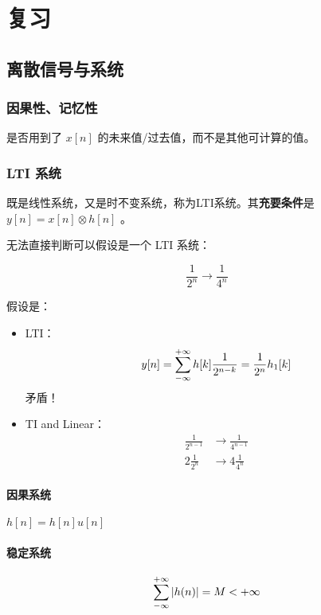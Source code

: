 \documentclass[cn,11pt,chinese,black,simple]{elegantbook}
\begin{document}
\fi 
\def\chapname{review}



\part{复习}

\chapter{离散信号与系统}

\section{因果性、记忆性}

是否用到了 \(x[n]\) 的未来值/过去值，而不是其他可计算的值。

\section{LTI 系统}

既是线性系统，又是时不变系统，称为LTI系统。其\textbf{充要条件}是 \(y[n] = x[n] \otimes h[n]\) 。

无法直接判断可以假设是一个 LTI 系统： 

\[\frac{1}{2^n} \rightarrow \frac{1}{4^n}\] 

假设是：

 \begin{itemize}
     \item LTI：\[y[n] = \sum_{-\infty}^{+\infty} h[k] \frac{1}{2^{n-k}} = \frac{1}{2^n} h_1[k]\] 矛盾！
     \item TI and Linear： \[\begin{aligned}
        \frac{1}{2^{n-1}} &\rightarrow \frac{1}{4^{n-1}} \\
        2 \frac{1}{2^n} &\rightarrow 4 \frac{1}{4^n}
     \end{aligned}\]
 \end{itemize}

\subsection{因果系统}

\(h[n] = h[n] u[n]\) 

\subsection{稳定系统}

\[
\displaystyle\sum_{-\infty}^{+\infty} |h(n)| =M<+\infty
\]
\end{document}
